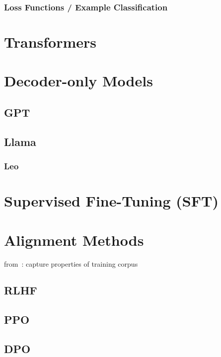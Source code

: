 


\subsubsection{Loss Functions / Example Classification}


\section{Transformers}\label{sec:trans}


\section{Decoder-only Models}\label{sec:decoder}

\subsection{GPT}\label{subsec:gpt}

\subsection{Llama}\label{subsec:llama}

\subsubsection{Leo}


\section{Supervised Fine-Tuning (SFT)}\label{sec:supervised-fine-tuning}


\section{Alignment Methods}\label{sec:alignment-methods}
from~\autocite{zhao2023survey}:
capture properties of training corpus

\subsection{RLHF}\label{subsec:rlhf}

\subsection{PPO}\label{subsec:ppo}

\subsection{DPO}\label{subsec:dpo}
